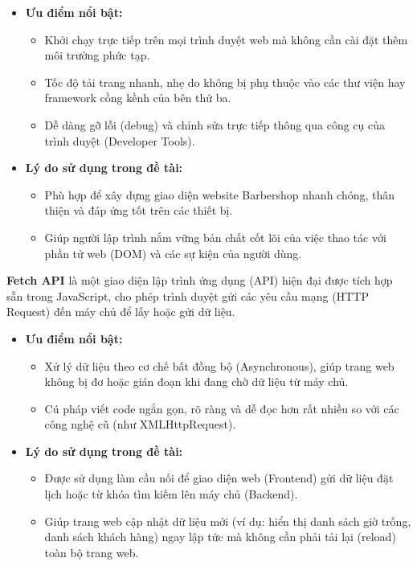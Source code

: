 \begin{itemize}
\item
	\textbf{Ưu điểm nổi bật:}

	\begin{itemize}
	\item
		Khởi chạy trực tiếp trên mọi trình duyệt web mà không cần cài đặt
		thêm môi trường phức tạp.
	\item
		Tốc độ tải trang nhanh, nhẹ do không bị phụ thuộc vào các thư viện
		hay framework cồng kềnh của bên thứ ba.
	\item
		Dễ dàng gỡ lỗi (debug) và chỉnh sửa trực tiếp thông qua công cụ của
		trình duyệt (Developer Tools).
	\end{itemize}
\item
	\textbf{Lý do sử dụng trong đề tài:}

	\begin{itemize}
	\item
		Phù hợp để xây dựng giao diện website Barbershop nhanh chóng, thân
		thiện và đáp ứng tốt trên các thiết bị.
	\item
		Giúp người lập trình nắm vững bản chất cốt lõi của việc thao tác với
		phần tử web (DOM) và các sự kiện của người dùng.
	\end{itemize}
\end{itemize}

\textbf{Fetch API} là một giao diện lập trình ứng dụng (API) hiện đại
được tích hợp sẵn trong JavaScript, cho phép trình duyệt gửi các yêu
cầu mạng (HTTP Request) đến máy chủ để lấy hoặc gửi dữ liệu.

\begin{itemize}
\item
	\textbf{Ưu điểm nổi bật:}

	\begin{itemize}
	\item
		Xử lý dữ liệu theo cơ chế bất đồng bộ (Asynchronous), giúp trang web
		không bị đơ hoặc gián đoạn khi đang chờ dữ liệu từ máy chủ.
	\item
		Cú pháp viết code ngắn gọn, rõ ràng và dễ đọc hơn rất nhiều so với
		các công nghệ cũ (như XMLHttpRequest).
	\end{itemize}
\item
	\textbf{Lý do sử dụng trong đề tài:}

	\begin{itemize}
	\item
		Được sử dụng làm cầu nối để giao diện web (Frontend) gửi dữ liệu đặt
		lịch hoặc từ khóa tìm kiếm lên máy chủ (Backend).
	\item
		Giúp trang web cập nhật dữ liệu mới (ví dụ: hiển thị danh sách giờ
		trống, danh sách khách hàng) ngay lập tức mà không cần phải tải lại
		(reload) toàn bộ trang web.
	\end{itemize}
\end{itemize}

